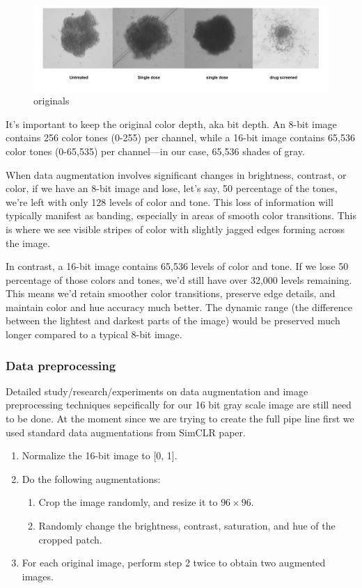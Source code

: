\documentclass[a4paper,12pt]{report}
\begin{document}
\begin{figure}[H]
  \centering
  \includegraphics[scale=0.8]{figures/originals.pdf} 
  \caption{originals}
  \label{fig:originals}
\end{figure}

It’s important to keep the original color depth, aka bit depth. An 8-bit image contains 256 color tones (0-255) per channel, while a 16-bit image contains 65,536 color tones (0-65,535) per channel—in our case, 65,536 shades of gray.

When data augmentation involves significant changes in brightness, contrast, or color, if we have an 8-bit image and lose, let’s say, 50 percentage of the tones, we’re left with only 128 levels of color and tone. This loss of information will typically manifest as banding, especially in areas of smooth color transitions. This is where we see visible stripes of color with slightly jagged edges forming across the image.

In contrast, a 16-bit image contains 65,536 levels of color and tone. If we lose 50 percentage of those colors and tones, we’d still have over 32,000 levels remaining. This means we’d retain smoother color transitions, preserve edge details, and maintain color and hue accuracy much better. The dynamic range (the difference between the lightest and darkest parts of the image) would be preserved much longer compared to a typical 8-bit image.



\subsubsection{Data preprocessing}

Detailed study/research/experiments on data augmentation and image preprocessing techniques sepcifically for our 16 bit gray scale image are still need to be done.
At the moment since we are trying to create the full pipe line first we used standard data augmentations from SimCLR paper.

\begin{enumerate}
  \item Normalize the 16-bit image to [0, 1].
  \item Do the following augmentations:
  \begin{enumerate}
      \item Crop the image randomly, and resize it to $96 \times 96$.
      \item Randomly change the brightness, contrast, saturation, and hue of the cropped patch.
  \end{enumerate}
  \item For each original image, perform step 2 twice to obtain two augmented images.
\end{enumerate}
\end{document}
